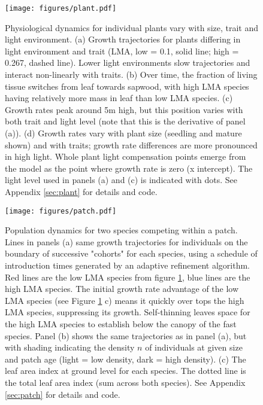 \documentclass[a4paper,11pt]{article}
\begin{document}
\newpage

\begin{figure}[h!]
\centering
\texttt{[image: figures/plant.pdf]}
\caption{Physiological dynamics for individual plants vary with size, trait
and light environment. (a) Growth trajectories for plants differing in light
environment and trait (LMA, low = 0.1, solid line; high =  0.267, dashed
line). Lower light environments slow trajectories and interact non-linearly
with traits. (b) Over time, the fraction of living tissue switches from leaf
towards sapwood, with high LMA species having relatively more mass in leaf
than low LMA species. (c) Growth rates peak around 5m high, but this position
varies with both trait and light level (note that this is the derivative of
panel (a)). (d) Growth rates vary with plant size (seedling and mature shown)
and with traits; growth rate differences are more pronounced in high light.
Whole plant light compensation points emerge from the model as the point where
growth rate is zero (x intercept).  The light level used in panels (a) and (c)
is indicated with dots.  See Appendix \ref{sec:plant} for details and code.}
\label{fig:plant}
\end{figure}

\newpage

\begin{figure}[h!]
\centering
\texttt{[image: figures/patch.pdf]}
\caption{Population dynamics for two species competing within a patch. Lines
in panels (a) same growth trajectories for individuals on the
boundary of successive "cohorts" for each species, using a schedule of 
introduction times generated by an adaptive refinement algorithm.
 Red lines are the low LMA
species from figure \ref{fig:plant}, blue lines are the high LMA species.  The
initial growth rate advantage of the low LMA species (see Figure
\ref{fig:plant} c) means it quickly over tops the high LMA species,
suppressing its growth.  Self-thinning leaves space for the high LMA species
to establish below the canopy of the fast species. Panel (b) shows the same
trajectories as in panel (a), but with shading indicating the density $n$ of
individuals at given size and patch age (light = low density, dark = high density).  
(c) The leaf area index at ground
level for each species.  The dotted line is the total leaf area index (sum
across both species). See Appendix \ref{sec:patch} for details and code.}
\label{fig:patch}
\end{figure}
\end{document}
